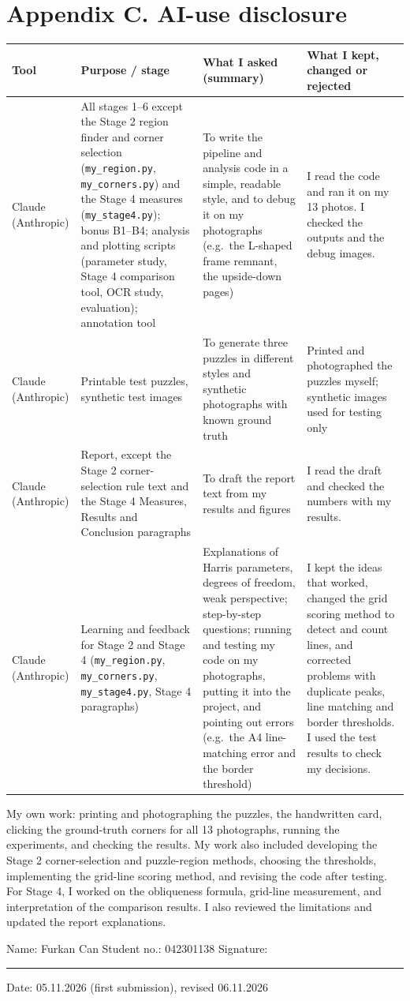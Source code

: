 \documentclass[conference]{IEEEtran}%
\newcommand{\STUDENTKEPT}{I read the code and ran it on my 13 photos. I checked
the outputs and the debug images.}
\newcommand{\STUDENTREPORT}{I read the draft and checked the numbers with my
results.}
\newcommand{\STUDENTOWN}{and checking the results}
\begin{document}
\section*{Appendix C. AI-use disclosure}
\begin{center}
\small
\begin{tabular}{p{2.2cm}p{3.6cm}p{5cm}p{5cm}}
\toprule
Tool & Purpose / stage & What I asked (summary) & What I kept, changed or rejected \\
\midrule
Claude (Anthropic) & All stages 1--6 except the Stage 2 region finder and corner selection (\texttt{my\_region.py}, \texttt{my\_corners.py}) and the Stage 4 measures (\texttt{my\_stage4.py}); bonus B1--B4; analysis and plotting scripts (parameter study, Stage 4 comparison tool, OCR study, evaluation); annotation tool & To write the pipeline and analysis code in a simple, readable style, and to debug it on my photographs (e.g.\ the L-shaped frame remnant, the upside-down pages) & \STUDENTKEPT \\
Claude (Anthropic) & Printable test puzzles, synthetic test images & To generate three puzzles in different styles and synthetic photographs with known ground truth & Printed and photographed the puzzles myself; synthetic images used for testing only \\
Claude (Anthropic) & Report, except the Stage 2 corner-selection rule text and the Stage 4 Measures, Results and Conclusion paragraphs & To draft the report text from my results and figures & \STUDENTREPORT \\
Claude (Anthropic) & Learning and feedback for Stage 2 and Stage 4 (\texttt{my\_region.py}, \texttt{my\_corners.py}, \texttt{my\_stage4.py}, Stage 4 paragraphs) & Explanations of Harris parameters, degrees of freedom, weak perspective; step-by-step questions; running and testing my code on my photographs, putting it into the project, and pointing out errors (e.g.\ the A4 line-matching error and the border threshold) & I kept the ideas that worked, changed the grid scoring method to detect and count lines, and corrected problems with duplicate peaks, line matching and border thresholds. I used the test results to check my decisions. \\
\bottomrule
\end{tabular}
\end{center}

\noindent My own work: printing and photographing the puzzles, the handwritten
card, clicking the ground-truth corners for all 13 photographs, running the
experiments, \STUDENTOWN. My work also included developing the Stage 2
corner-selection and puzzle-region methods, choosing the thresholds,
implementing the grid-line scoring method, and revising the code after testing.
For Stage 4, I worked on the obliqueness formula, grid-line measurement, and
interpretation of the comparison results. I also reviewed the limitations and
updated the report explanations.


\vspace{0.8cm}
\noindent Name: Furkan Can \hfill Student no.: 042301138 \hfill Signature: \rule{3.5cm}{0.4pt}

\vspace{0.3cm}
\noindent Date: 05.11.2026 (first submission), revised 06.11.2026
\end{document}
